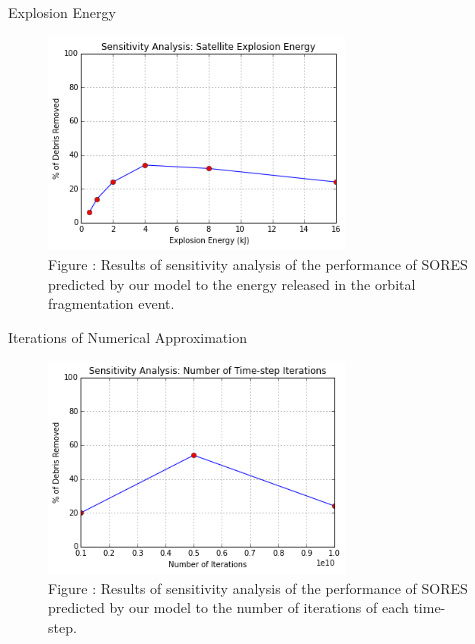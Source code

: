 \documentclass{beamer}
\begin{document}
\begin{frame}{Explosion Energy}
\begin{figure}
\begin{center}
\label{fig:explosionenergysensitivity}
\includegraphics[width=0.7\textwidth]{energy.png}\\
Figure : Results of sensitivity analysis of the performance of SORES predicted by our model to the energy released in the orbital fragmentation event.
\end{center}
\end{figure}
\end{frame}

\begin{frame}{Iterations of Numerical Approximation}
\begin{figure}
\begin{center}
\label{fig:iterationsensitivity}
\includegraphics[width=0.7\textwidth]{iterations.png}\\
Figure : Results of sensitivity analysis of the performance of SORES predicted by our model to the number of iterations of each time-step.
\end{center}
\end{figure}
\end{frame}
\end{document}
